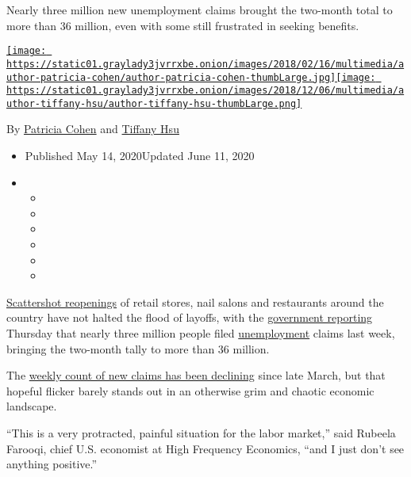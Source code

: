 Nearly three million new unemployment claims brought the two-month total
to more than 36 million, even with some still frustrated in seeking
benefits.

\href{https://www.nytimes3xbfgragh.onion/by/patricia-cohen}{\texttt{[image: https://static01.graylady3jvrrxbe.onion/images/2018/02/16/multimedia/author-patricia-cohen/author-patricia-cohen-thumbLarge.jpg]}}\href{https://www.nytimes3xbfgragh.onion/by/tiffany-hsu}{\texttt{[image: https://static01.graylady3jvrrxbe.onion/images/2018/12/06/multimedia/author-tiffany-hsu/author-tiffany-hsu-thumbLarge.png]}}

By \href{https://www.nytimes3xbfgragh.onion/by/patricia-cohen}{Patricia
Cohen} and
\href{https://www.nytimes3xbfgragh.onion/by/tiffany-hsu}{Tiffany Hsu}

\begin{itemize}
\item
  Published May 14, 2020Updated June 11, 2020
\item
  \begin{itemize}
  \item
  \item
  \item
  \item
  \item
  \item
  \end{itemize}
\end{itemize}

\href{https://www.nytimes3xbfgragh.onion/interactive/2020/us/states-reopen-map-coronavirus.html}{Scattershot
reopenings} of retail stores, nail salons and restaurants around the
country have not halted the flood of layoffs, with the
\href{https://www.dol.gov/ui/data.pdf}{government reporting} Thursday
that nearly three million people filed
\href{https://www.nytimes3xbfgragh.onion/2020/06/11/business/economy/unemployment-claims-coronavirus.html}{unemployment}
claims last week, bringing the two-month tally to more than 36 million.

The
\href{https://www.nytimes3xbfgragh.onion/2020/06/04/business/economy/coronavirus-unemployment-claims.html}{weekly
count of new claims has been declining} since late March, but that
hopeful flicker barely stands out in an otherwise grim and chaotic
economic landscape.

``This is a very protracted, painful situation for the labor market,''
said Rubeela Farooqi, chief U.S. economist at High Frequency Economics,
``and I just don't see anything positive.''

